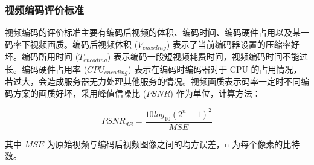 \subsubsection{视频编码评价标准}

视频编码的评价标准主要有编码后视频的体积、编码时间、编码硬件占用以及某一码率下视频画质。编码后视频体积 ($V_{encoding}$) 表示了当前编码器设置的压缩率好坏。编码所用时间 ($T_{encoding}$) 表示编码一段短视频耗费时间，视频编码时间不能过长。编码硬件占用率 ($CPU_{encoding}$) 表示在编码时编码器对于 CPU 的占用情况，若过大，会造成服务器无力处理其他服务的情况。视频画质表示码率一定时不同编码方案的画质好坏，采用峰值信噪比 ($PSNR$) 作为单位，计算方法：

\begin{equation}
\label{eq:forward_back_pre}
PSNR_{dB} = \frac{10log_{10}(2^{n} - 1)^{2}}{MSE}
\end{equation}

其中 $MSE$ 为原始视频与编码后视频图像之间的均方误差，n 为每个像素的比特数。







